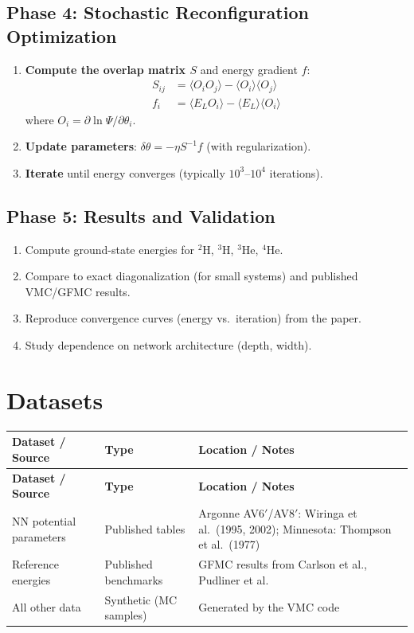 \documentclass[11pt,a4paper]{article}
\begin{document}
\subsection{Phase 4: Stochastic Reconfiguration Optimization}
\begin{enumerate}[label=\textbf{4.\arabic*}]
  \item \textbf{Compute the overlap matrix $S$} and energy gradient $f$:
    \begin{align*}
      S_{ij} &= \langle O_i O_j \rangle - \langle O_i \rangle \langle O_j \rangle \\
      f_i &= \langle E_L O_i \rangle - \langle E_L \rangle \langle O_i \rangle
    \end{align*}
    where $O_i = \partial \ln \Psi / \partial \theta_i$.
  \item \textbf{Update parameters}: $\delta \theta = -\eta S^{-1} f$ (with regularization).
  \item \textbf{Iterate} until energy converges (typically $10^3$--$10^4$ iterations).
\end{enumerate}

\subsection{Phase 5: Results and Validation}
\begin{enumerate}[label=\textbf{5.\arabic*}]
  \item Compute ground-state energies for $^2$H, $^3$H, $^3$He, $^4$He.
  \item Compare to exact diagonalization (for small systems) and published VMC/GFMC results.
  \item Reproduce convergence curves (energy vs.\ iteration) from the paper.
  \item Study dependence on network architecture (depth, width).
\end{enumerate}

\section{Datasets}

\begin{longtable}{p{4.5cm} p{3.5cm} p{6cm}}
\toprule
\textbf{Dataset / Source} & \textbf{Type} & \textbf{Location / Notes} \\
\midrule
\endfirsthead
\toprule
\textbf{Dataset / Source} & \textbf{Type} & \textbf{Location / Notes} \\
\midrule
\endhead
NN potential parameters & Published tables & Argonne AV6$'$/AV8$'$: Wiringa et al.\ (1995, 2002); Minnesota: Thompson et al.\ (1977) \\
\midrule
Reference energies & Published benchmarks & GFMC results from Carlson et al., Pudliner et al. \\
\midrule
All other data & Synthetic (MC samples) & Generated by the VMC code \\
\bottomrule
\end{longtable}
\end{document}
